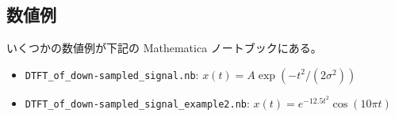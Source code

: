         \subsection{数値例}
            いくつかの数値例が下記の Mathematica ノートブックにある。
            \begin{itemize}
                \item \verb|DTFT_of_down-sampled_signal.nb|: $x(t) = A\exp(-t^2/(2\sigma^2))$
                \item \verb|DTFT_of_down-sampled_signal_example2.nb|: $x(t) = e^{-12.5 t^2}\cos(10\pi t)$
            \end{itemize}
